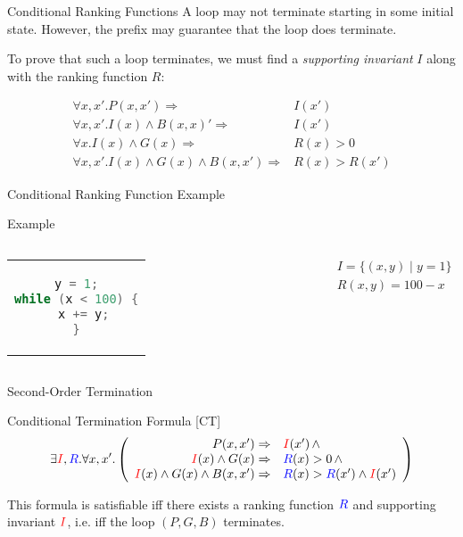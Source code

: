\documentclass[xcolor=pdftex,t,11pt]{beamer}
\newcommand{\red}[1]{\textcolor{red}{#1}}
\newcommand{\blue}[1]{\textcolor{blue}{#1}}
\begin{document}
\begin{frame}[fragile]{Conditional Ranking Functions}
 A loop may not terminate starting in some initial state.  However, the prefix may guarantee
 that the loop does terminate.

 To prove that such a loop terminates, we must find a \emph{supporting invariant} $I$ along with the
 ranking function $R$:

 \begin{eqnarray*}
  \forall x, x' . P(x, x') \Rightarrow & I(x') \\
  \forall x, x' . I(x) \wedge B(x, x)' \Rightarrow & I(x') \\
  \forall x . I(x) \wedge G(x) \Rightarrow & R(x) > 0 \\
  \forall x, x' . I(x) \wedge G(x) \wedge B(x, x') \Rightarrow & R(x) > R(x')
 \end{eqnarray*}
\end{frame}

\begin{frame}[fragile]{Conditional Ranking Function Example}
\begin{exampleblock}{Example}
\begin{center}
\begin{columns}[T]
  \begin{tabular}{c}
   \begin{lstlisting}[language=c,basicstyle=\normalsize]
y = 1;
while (x < 100) {
  x += y;
}
   \end{lstlisting}
  \end{tabular}
\begin{gather*}
  I =  \{ (x, y) \mid y = 1 \} \\
  R(x, y) =  100 - x
\end{gather*}
\end{columns}
\end{center}
\end{exampleblock}
\end{frame}

\begin{frame}{Second-Order Termination}

\begin{block}{Conditional Termination Formula [CT]}
 \[
 \exists \red{I}, \blue{R} .  \forall x, x' . \left ( \begin{array}{rl}
   P(x, x') \Rightarrow & \red{I}(x') \, \wedge \\
   \red{I}(x) \wedge G(x) \Rightarrow & \blue{R}(x) > 0 \, \wedge \\
   \red{I}(x) \wedge G(x) \wedge B(x, x') \Rightarrow & \blue{R}(x) > \blue{R}(x') \wedge \red{I}(x')
   \end{array} \right )
 \]
 \end{block}

 \vspace{1em}

This formula is satisfiable iff there exists a ranking function $\blue{R}$ and supporting invariant $\red{I}$,
i.e. iff the loop $(P, G, B)$ terminates.
 
\end{frame}
\end{document}
